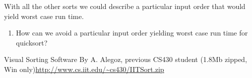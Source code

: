 \documentclass[12pt]{report}
\begin{document}
\noindent With all the other sorts we could describe a particular input order that would yield worst case run time.
\begin{enumerate}[label=\arabic*.,start=7]
	\item How can we avoid a particular input order yielding worst case run time for quicksort? %
\end{enumerate}

\noindent Visual Sorting Software By A. Alegoz, previous CS430 student (1.8Mb zipped, Win only)\url{http://www.cs.iit.edu/~cs430/IITSort.zip}
\end{document}
